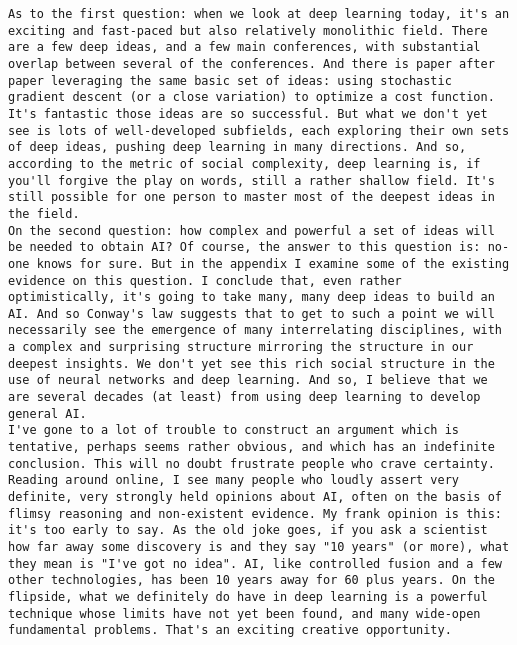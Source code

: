 \begin{lstlisting}
As to the first question: when we look at deep learning today, it's an exciting and fast-paced but also relatively monolithic field. There are a few deep ideas, and a few main conferences, with substantial overlap between several of the conferences. And there is paper after paper leveraging the same basic set of ideas: using stochastic gradient descent (or a close variation) to optimize a cost function. It's fantastic those ideas are so successful. But what we don't yet see is lots of well-developed subfields, each exploring their own sets of deep ideas, pushing deep learning in many directions. And so, according to the metric of social complexity, deep learning is, if you'll forgive the play on words, still a rather shallow field. It's still possible for one person to master most of the deepest ideas in the field.
On the second question: how complex and powerful a set of ideas will be needed to obtain AI? Of course, the answer to this question is: no-one knows for sure. But in the appendix I examine some of the existing evidence on this question. I conclude that, even rather optimistically, it's going to take many, many deep ideas to build an AI. And so Conway's law suggests that to get to such a point we will necessarily see the emergence of many interrelating disciplines, with a complex and surprising structure mirroring the structure in our deepest insights. We don't yet see this rich social structure in the use of neural networks and deep learning. And so, I believe that we are several decades (at least) from using deep learning to develop general AI.
I've gone to a lot of trouble to construct an argument which is tentative, perhaps seems rather obvious, and which has an indefinite conclusion. This will no doubt frustrate people who crave certainty. Reading around online, I see many people who loudly assert very definite, very strongly held opinions about AI, often on the basis of flimsy reasoning and non-existent evidence. My frank opinion is this: it's too early to say. As the old joke goes, if you ask a scientist how far away some discovery is and they say "10 years" (or more), what they mean is "I've got no idea". AI, like controlled fusion and a few other technologies, has been 10 years away for 60 plus years. On the flipside, what we definitely do have in deep learning is a powerful technique whose limits have not yet been found, and many wide-open fundamental problems. That's an exciting creative opportunity.


\end{lstlisting}
